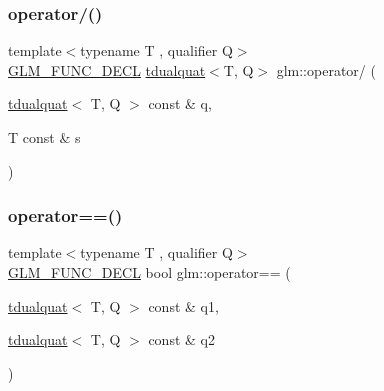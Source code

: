 \mbox{\label{group__gtx__dual__quaternion_gaac31fa68a57186cd22388eb385ca115d}} 
\subsubsection{\texorpdfstring{operator/()}{operator/()}}
{\footnotesize\ttfamily template$<$typename T , qualifier Q$>$ \\
\hyperlink{setup_8hpp_ab2d052de21a70539923e9bcbf6e83a51}{G\+L\+M\+\_\+\+F\+U\+N\+C\+\_\+\+D\+E\+CL} \hyperlink{structglm_1_1tdualquat}{tdualquat}$<$T, Q$>$ glm\+::operator/ (\begin{DoxyParamCaption}\item[{\hyperlink{structglm_1_1tdualquat}{tdualquat}$<$ T, Q $>$ const \&}]{q,  }\item[{T const \&}]{s }\end{DoxyParamCaption})}

\mbox{\label{group__gtx__dual__quaternion_ga82faf668287e9ca3c9751d873a85970d}} 
\subsubsection{\texorpdfstring{operator==()}{operator==()}}
{\footnotesize\ttfamily template$<$typename T , qualifier Q$>$ \\
\hyperlink{setup_8hpp_ab2d052de21a70539923e9bcbf6e83a51}{G\+L\+M\+\_\+\+F\+U\+N\+C\+\_\+\+D\+E\+CL} bool glm\+::operator== (\begin{DoxyParamCaption}\item[{\hyperlink{structglm_1_1tdualquat}{tdualquat}$<$ T, Q $>$ const \&}]{q1,  }\item[{\hyperlink{structglm_1_1tdualquat}{tdualquat}$<$ T, Q $>$ const \&}]{q2 }\end{DoxyParamCaption})}

